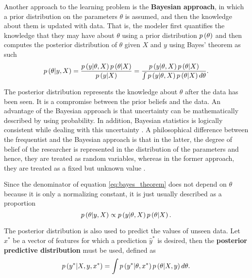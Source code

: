 Another approach to the learning problem is the \textbf{Bayesian approach}, in which a prior distribution on the parameters $\theta$ is assumed, and then the knowledge about them is updated with data. That is, the modeler first quantifies the knowledge that they may have about $\theta$ using a prior distribution $p\left( \theta \right)$ and then computes the posterior distribution of $\theta$ given $X$ and $y$ using Bayes' theorem as such
\begin{equation}
  \label{eq:bayes_theorem}
  p\left( \theta | y, X  \right) = \frac{p\left( y | \theta, X \right) p\left( \theta | X \right)}{p\left( y | X \right)} = \frac{p\left( y | \theta, X \right) p\left( \theta | X \right)}{\int p\left( y | \theta, X \right) p\left( \theta | X \right) d\theta}.
\end{equation}

The posterior distribution represents the knowledge about $\theta$ after the data has been seen. It is a compromise between the prior beliefs and the data. An advantage of the Bayesian approach is that uncertainty can be mathematically described by using probability. In addition, Bayesian statistics is logically consistent while dealing with this uncertainty \cite{cox1946probability} \cite{cox1963algebra} \cite{jaynes2003probability} \cite{o2004advanced}. A philosophical difference between the frequentist and the Bayesian approach is that in the latter, the degree of belief of the researcher is represented in the distribution of the parameters and hence, they are treated as random variables, whereas in the former approach, they are treated as a fixed but unknown value \cite{o2004advanced}.

Since the denominator of equation \eqref{eq:bayes_theorem} does not depend on $\theta$ because it is only a normalizing constant, it is just usually described as a proportion
\begin{equation}
  \label{eq:bayes_theorem_prop}
    p\left( \theta | y, X \right) \propto p\left( y | \theta, X \right) p\left( \theta | X \right).
\end{equation}

The posterior distribution is also used to predict the values of unseen data. Let $x^*$ be a vector of features for which a prediction $\hat{y}^*$ is desired, then the \textbf{posterior predictive distribution} must be used, defined as
\begin{equation}
  \label{eq:post_pred_dist}
  p\left( y^* | X, y, x^* \right) = \int p\left( y^* | \theta, x^* \right) p\left( \theta | X, y \right) d\theta.
\end{equation}

